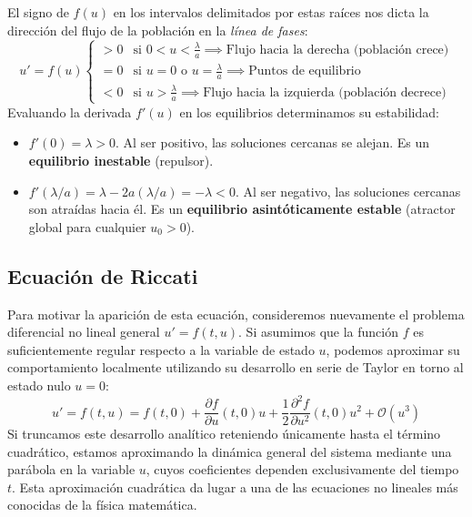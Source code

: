{    El signo de $f(u)$ en los intervalos delimitados por estas raíces nos dicta la dirección del flujo de la población en la \textit{línea de fases}:
    \[
        u' = f(u) \begin{cases}
            > 0 & \text{si } 0 < u < \frac{\lambda}{a} \implies \text{Flujo hacia la derecha (población crece)} \\
            = 0 & \text{si } u = 0 \text{ o } u = \frac{\lambda}{a} \implies \text{Puntos de equilibrio} \\
            < 0 & \text{si } u > \frac{\lambda}{a} \implies \text{Flujo hacia la izquierda (población decrece)}
        \end{cases}
    \]
    Evaluando la derivada $f'(u)$ en los equilibrios determinamos su estabilidad:
    \begin{itemize}
        \item $f'(0) = \lambda > 0$. Al ser positivo, las soluciones cercanas se alejan. Es un \textbf{equilibrio inestable} (repulsor).
        \item $f'(\lambda/a) = \lambda - 2a(\lambda/a) = -\lambda < 0$. Al ser negativo, las soluciones cercanas son atraídas hacia él. Es un \textbf{equilibrio asintóticamente estable} (atractor global para cualquier $u_0 > 0$).
    \end{itemize}

}



\subsection{Ecuación de Riccati}

Para motivar la aparición de esta ecuación, consideremos nuevamente el problema diferencial no lineal general $u' = f(t,u)$. Si asumimos que la función $f$ es suficientemente regular respecto a la variable de estado $u$, podemos aproximar su comportamiento localmente utilizando su desarrollo en serie de Taylor en torno al estado nulo $u=0$:
\[
    u' = f(t,u) = f(t,0) + \frac{\partial f}{\partial u}(t,0) u + \frac{1}{2} \frac{\partial^2 f}{\partial u^2}(t,0) u^2 + \mathcal{O}(u^3)
\]
Si truncamos este desarrollo analítico reteniendo únicamente hasta el término cuadrático, estamos aproximando la dinámica general del sistema mediante una parábola en la variable $u$, cuyos coeficientes dependen exclusivamente del tiempo $t$. Esta aproximación cuadrática da lugar a una de las ecuaciones no lineales más conocidas de la física matemática.

